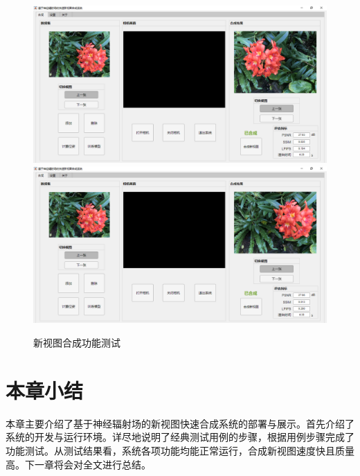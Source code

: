 \begin{figure}[bhtp]
    {\includegraphics[width=0.45\linewidth]{figures/system/3-g.png}}
    {\includegraphics[width=0.45\linewidth]{figures/system/3-h.png}}
  \caption{新视图合成功能测试}
  \label{fig:viewsynthesis}
\end{figure}
\newpage
\section{本章小结}
本章主要介绍了基于神经辐射场的新视图快速合成系统的部署与展示。首先介绍了系统的开发与运行环境。详尽地说明了经典测试用例的步骤，根据用例步骤完成了功能测试。从测试结果看，系统各项功能均能正常运行，合成新视图速度快且质量高。下一章将会对全文进行总结。






